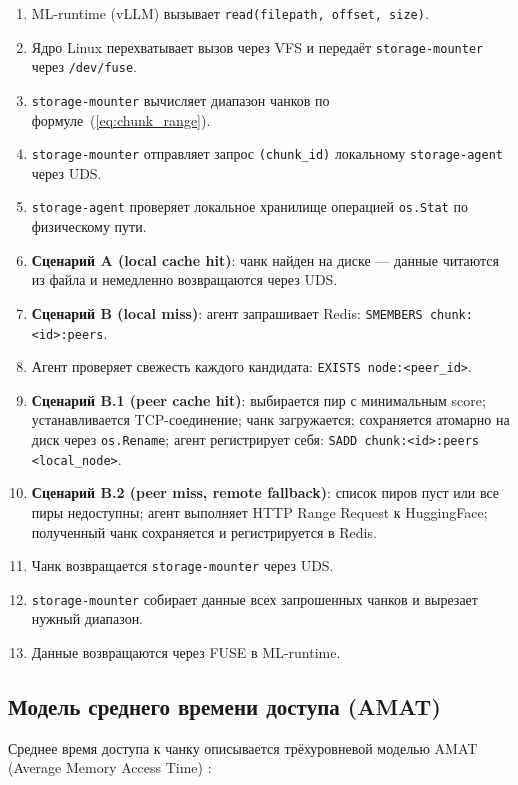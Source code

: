 \begin{enumerate}[leftmargin=*]
  \item ML-runtime (vLLM) вызывает \texttt{read(filepath, offset, size)}.
  \item Ядро Linux перехватывает вызов через VFS и передаёт \texttt{storage-mounter} через \texttt{/dev/fuse}.
  \item \texttt{storage-mounter} вычисляет диапазон чанков по формуле~(\ref{eq:chunk_range}).
  \item \texttt{storage-mounter} отправляет запрос \texttt{(chunk\_id)} локальному \texttt{storage-agent} через UDS.
  \item \texttt{storage-agent} проверяет локальное хранилище операцией \texttt{os.Stat} по физическому пути.
  \item \textbf{Сценарий A (local cache hit)}: чанк найден на диске --- данные читаются из файла и немедленно возвращаются через UDS.
  \item \textbf{Сценарий B (local miss)}: агент запрашивает Redis: \texttt{SMEMBERS chunk:<id>:peers}.
  \item Агент проверяет свежесть каждого кандидата: \texttt{EXISTS node:<peer\_id>}.
  \item \textbf{Сценарий B.1 (peer cache hit)}: выбирается пир с минимальным score; устанавливается TCP-соединение; чанк загружается; сохраняется атомарно на диск через \texttt{os.Rename}; агент регистрирует себя: \texttt{SADD chunk:<id>:peers <local\_node>}.
  \item \textbf{Сценарий B.2 (peer miss, remote fallback)}: список пиров пуст или все пиры недоступны; агент выполняет HTTP Range Request к HuggingFace; полученный чанк сохраняется и регистрируется в Redis.
  \item Чанк возвращается \texttt{storage-mounter} через UDS.
  \item \texttt{storage-mounter} собирает данные всех запрошенных чанков и вырезает нужный диапазон.
  \item Данные возвращаются через FUSE в ML-runtime.
\end{enumerate}

\subsection*{Модель среднего времени доступа (AMAT)}

Среднее время доступа к чанку описывается трёхуровневой моделью AMAT (Average Memory Access Time) \cite{hennessy2011ca}:

